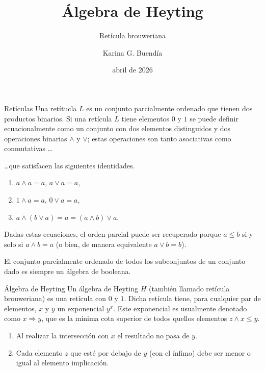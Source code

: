 \documentclass{beamer}
\title{Álgebra de Heyting}
\subtitle{Retícula brouweriana}
\author{Karina G. Buendía}
\date{abril de 2026}
\begin{document}
\frame{\titlepage}

\begin{frame}{Retículas}
    Una retítucla $L$ es un conjunto parcialmente ordenado que tienen dos productos binarios. Si una retícula $L$ tiene
    elementos $0$ y $1$ se puede definir ecuacionalmente como un conjunto con dos elementos distinguidos y dos operaciones
    binarias $\land$ y $\lor$; estas operaciones son tanto asociativas como conmutativas \dots
\end{frame}

\begin{frame}
    \dots que satisfacen las siguientes identidades.

    \begin{enumerate}
        \item $a \land a = a$, $a \lor a =a$,
        \item $1 \land a = a$, $0 \lor a =a$,
        \item $a \land (b \lor a) = a = (a \land b) \lor a$. 
    \end{enumerate}
\vspace{0.5cm}
    Dadas estas ecuaciones, el orden parcial puede ser recuperado porque $a \leq b$ si y solo si $a \land b = a$ (o bien,
    de manera equivalente $a \lor b = b$).

\vspace{0.5cm}
    El conjunto parcialmente ordenado de todos los subconjuntos de un conjunto dado es siempre un álgebra de booleana.
\end{frame}

\begin{frame}{Álgebra de Heyting}
    Un álgebra de Heyting $H$ (también llamado retícula brouweriana) es una retícula con $0$ y $1$. Dicha retícula tiene,
    para cualquier par de elementos, $x$ y $y$ un exponencial $y^x$. Este exponencial es usualmente denotado como
    $x \Rightarrow y$, que es la mínima cota superior de todos quellos elementos $z \land x \leq y$.
\vspace{0.5cm} 
    \begin{enumerate}
        \item Al realizar la intersección con $x$ el resultado no pasa de $y$.
        \item Cada elemento $z$ que esté por debajo de $y$ (con el ínfimo) debe ser menor o igual al elemento implicación.
    \end{enumerate}
\end{frame}
\end{document}
